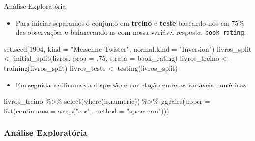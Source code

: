 \documentclass[
  9 pt,
  ignorenonframetext,
]{beamer}
\newenvironment{Shaded}{\begin{snugshade}}{\end{snugshade}}
\newcommand{\AttributeTok}[1]{\textcolor[rgb]{0.77,0.63,0.00}{#1}}
\newcommand{\DecValTok}[1]{\textcolor[rgb]{0.00,0.00,0.81}{#1}}
\newcommand{\FunctionTok}[1]{\textcolor[rgb]{0.00,0.00,0.00}{#1}}
\newcommand{\NormalTok}[1]{#1}
\newcommand{\OtherTok}[1]{\textcolor[rgb]{0.56,0.35,0.01}{#1}}
\newcommand{\SpecialCharTok}[1]{\textcolor[rgb]{0.00,0.00,0.00}{#1}}
\newcommand{\StringTok}[1]{\textcolor[rgb]{0.31,0.60,0.02}{#1}}
\providecommand{\tightlist}{%
  \setlength{\itemsep}{0pt}\setlength{\parskip}{0pt}}
\begin{document}
\begin{frame}[fragile]{Análise Exploratória}
\begin{itemize}
\tightlist
\item
  Para iniciar separamos o conjunto em \textbf{treino} e \textbf{teste}
  baseando-nos em 75\% das observações e balanceando-as com nossa
  variável resposta: \texttt{book\_rating}.
\end{itemize}

\begin{Shaded}
\begin{Highlighting}[]
\FunctionTok{set.seed}\NormalTok{(}\DecValTok{1904}\NormalTok{, }\AttributeTok{kind =} \StringTok{"Mersenne{-}Twister"}\NormalTok{, }\AttributeTok{normal.kind =} \StringTok{"Inversion"}\NormalTok{)}
\NormalTok{livros\_split }\OtherTok{\textless{}{-}} \FunctionTok{initial\_split}\NormalTok{(livros, }\AttributeTok{prop =}\NormalTok{ .}\DecValTok{75}\NormalTok{, }\AttributeTok{strata =}\NormalTok{ book\_rating)}
\NormalTok{livros\_treino }\OtherTok{\textless{}{-}} \FunctionTok{training}\NormalTok{(livros\_split)}
\NormalTok{livros\_teste }\OtherTok{\textless{}{-}} \FunctionTok{testing}\NormalTok{(livros\_split)}
\end{Highlighting}
\end{Shaded}

\begin{itemize}
\tightlist
\item
  Em seguida verificamos a dispersão e correlação entre as variáveis
  numéricas:
\end{itemize}

\begin{Shaded}
\begin{Highlighting}[]
\NormalTok{livros\_treino }\SpecialCharTok{\%\textgreater{}\%} 
  \FunctionTok{select}\NormalTok{(}\FunctionTok{where}\NormalTok{(is.numeric)) }\SpecialCharTok{\%\textgreater{}\%} 
  \FunctionTok{ggpairs}\NormalTok{(}\AttributeTok{upper =} \FunctionTok{list}\NormalTok{(}\AttributeTok{continuous =} \FunctionTok{wrap}\NormalTok{(}\StringTok{"cor"}\NormalTok{, }\AttributeTok{method =} \StringTok{"spearman"}\NormalTok{)))}
\end{Highlighting}
\end{Shaded}
\end{frame}

\hypertarget{anuxe1lise-exploratuxf3ria-1}{%
\subsubsection{Análise
Exploratória}\label{anuxe1lise-exploratuxf3ria-1}}
\end{document}
